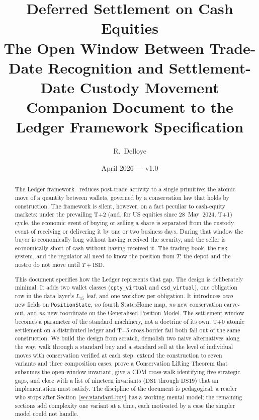 \documentclass[11pt,a4paper]{article}
\title{Deferred Settlement on Cash Equities\\[6pt]
\large The Open Window Between Trade-Date Recognition and Settlement-Date Custody Movement\\[4pt]
\normalsize Companion Document to the Ledger Framework Specification}
\author{R.\ Delloye}
\date{April 2026 --- v1.0}
\begin{document}
\maketitle

\begin{abstract}
The Ledger framework~\cite{ledger} reduces post-trade activity to a single primitive: the atomic move of a quantity between wallets, governed by a conservation law that holds by construction. The framework is silent, however, on a fact peculiar to cash-equity markets: under the prevailing T+2 (and, for US equities since 28~May~2024, T+1) cycle, the economic event of buying or selling a share is separated from the custody event of receiving or delivering it by one or two business days. During that window the buyer is economically long without having received the security, and the seller is economically short of cash without having received it. The trading book, the risk system, and the regulator all need to know the position from $T$; the depot and the nostro do not move until $T+\text{ISD}$.

This document specifies how the Ledger represents that gap. The design is deliberately minimal. It adds two wallet classes (\texttt{cpty\_virtual} and \texttt{csd\_virtual}), one obligation row in the data layer's $L_{15}$ leaf, and one workflow per obligation. It introduces \emph{zero} new fields on \texttt{PositionState}, \emph{no} fourth StatesHome map, \emph{no} new conservation carve-out, and \emph{no} new coordinate on the Generalised Position Model. The settlement window becomes a parameter of the standard machinery, not a doctrine of its own; T+0 atomic settlement on a distributed ledger and T+5 cross-border fail both fall out of the same construction. We build the design from scratch, demolish two naive alternatives along the way, walk through a standard buy and a standard sell at the level of individual moves with conservation verified at each step, extend the construction to seven variants and three composition cases, prove a Conservation Lifting Theorem that subsumes the open-window invariant, give a CDM cross-walk identifying five strategic gaps, and close with a list of nineteen invariants ($\mathrm{DS1}$ through $\mathrm{DS19}$) that an implementation must satisfy. The discipline of the document is pedagogical: a reader who stops after Section~\ref{sec:standard-buy} has a working mental model; the remaining sections add complexity one variant at a time, each motivated by a case the simpler model could not handle.
\end{abstract}
\end{document}
